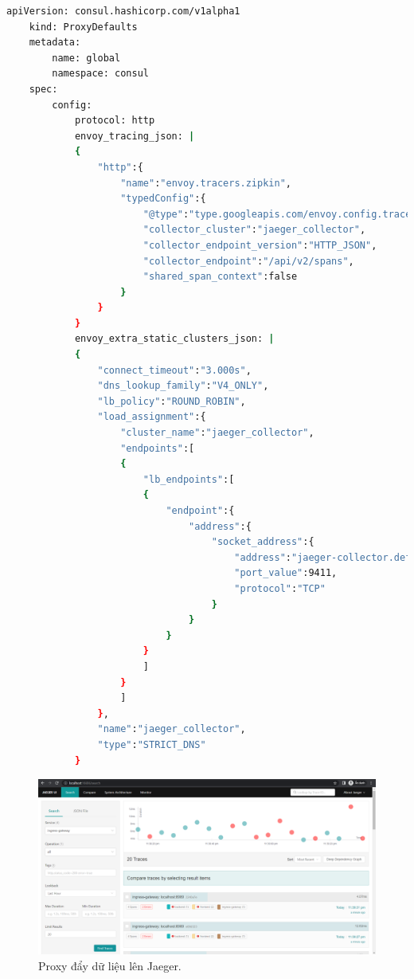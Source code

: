 \documentclass[12pt,a4paper]{report}
\begin{document}
	\hspace{0.3cm}{Tiếp theo, chúng ta tiến hành đẩy dữ liệu từ ứng dụng frontend, backend và Proxy lên Jaeger. Để làm được điều này, chúng ta cần can thiệp vào trong code của ứng dụng. Tuy nhiên, ứng dụng frontend và backend đã được cấu hình để có thể đẩy dữ liệu ứng dụng lên trên Jaeger nên chúng ta chỉ việc khai báo thêm biến môi trường cho ứng dụng và ứng dụng sẽ đẩy dữ liệu lên. Còn đối với Proxy, chúng ta cần cấu hình lại một chút như sau:}
	\begin{lstlisting}[language=Bash]
	apiVersion: consul.hashicorp.com/v1alpha1
	kind: ProxyDefaults
	metadata:
		name: global
		namespace: consul
	spec:
		config:
			protocol: http
			envoy_tracing_json: |
			{
				"http":{
					"name":"envoy.tracers.zipkin",
					"typedConfig":{
						"@type":"type.googleapis.com/envoy.config.trace.v3.ZipkinConfig",
						"collector_cluster":"jaeger_collector",
						"collector_endpoint_version":"HTTP_JSON",
						"collector_endpoint":"/api/v2/spans",
						"shared_span_context":false
					}
				}
			}
			envoy_extra_static_clusters_json: |
			{
				"connect_timeout":"3.000s",
				"dns_lookup_family":"V4_ONLY",
				"lb_policy":"ROUND_ROBIN",
				"load_assignment":{
					"cluster_name":"jaeger_collector",
					"endpoints":[
					{
						"lb_endpoints":[
						{
							"endpoint":{
								"address":{
									"socket_address":{
										"address":"jaeger-collector.default",
										"port_value":9411,
										"protocol":"TCP"
									}
								}
							}
						}
						]
					}
					]
				},
				"name":"jaeger_collector",
				"type":"STRICT_DNS"
			}
	\end{lstlisting}
	\hspace{1.0cm}{Sau khi apply lại, thì chúng ta sẽ lên giao diện của Jaeger và kiểm tra: \\}
	\begin{figure}[h]
		\centering
		\includegraphics[width=1\linewidth]{Pics/jaeger-ingress-gateway}
		\caption{\label{fig:jaeger-ingress-gateway} Proxy đẩy dữ liệu lên Jaeger.}
		\label{fig:jaeger-ingress-gateway}
	\end{figure}
\end{document}

